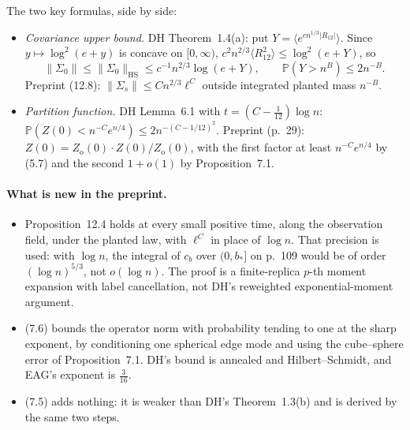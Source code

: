 \documentclass[11pt]{article}
\renewcommand{\P}{\mathbb{P}}
\newcommand{\norm}[1]{\lVert #1\rVert}
\newcommand{\ploc}[2]{#1}
\begin{document}
The two key formulas, side by side:
\begin{itemize}
\item \emph{Covariance upper bound.} DH Theorem~1.4(a): put
 $Y=\langle e^{cn^{1/3}|R_{12}|}\rangle$. Since $y\mapsto\log^2(e+y)$ is
 concave on $[0,\infty)$, $c^2n^{2/3}\langle R_{12}^2\rangle\le\log^2(e+Y)$, so
 \[
  \norm{\Sigma_0}\le\norm{\Sigma_0}_{\mathrm{HS}}\le c^{-1}n^{2/3}\log(e+Y),
  \qquad \P(Y>n^B)\le2n^{-B}.
 \]
 Preprint \ploc{(12.8)}{profile-amplification.tex:943--948}:
 $\norm{\Sigma_s}\le Cn^{2/3}\ell^C$ outside integrated planted mass $n^{-B}$.
\item \emph{Partition function.} DH Lemma~6.1 with $t=(C-\frac1{12})\log n$:
 $\P(Z(0)<n^{-C}e^{n/4})\le2n^{-(C-1/12)^2}$. Preprint
 \ploc{(p.~29)}{profile-spectral.tex:1341--1345}:
 $Z(0)=Z_{\mathrm o}(0)\cdot Z(0)/Z_{\mathrm o}(0)$, with the first factor at
 least $n^{-C}e^{n/4}$ by (5.7) and the second $1+o(1)$ by Proposition~7.1.
\end{itemize}

\paragraph{What is new in the preprint.}
\begin{itemize}
\item Proposition~12.4 holds at every small positive time, along the
 observation field, under the planted law, with $\ell^C$ in place of
 $\log n$. That precision is used: with $\log n$, the integral of $c_b$ over
 $(0,b_*]$ on p.~109 would be of order $(\log n)^{5/3}$, not $o(\log n)$. The
 proof is a finite-replica $p$-th moment expansion with label cancellation,
 not DH's reweighted exponential-moment argument.
\item (7.6) bounds the operator norm with probability tending to one at the
 sharp exponent, by conditioning one spherical edge mode and using the
 cube--sphere error of Proposition~7.1. DH's bound is annealed and
 Hilbert--Schmidt, and EAG's exponent is $\frac3{16}$.
\item (7.5) adds nothing: it is weaker than DH's Theorem~1.3(b) and is derived
 by the same two steps.
\end{itemize}
\end{document}
